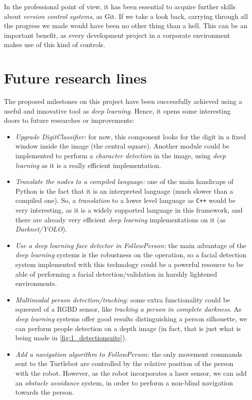	
	In the professional point of view, it has been essential to acquire further skills about \emph{version control systems}, as Git. If we take a look back, carrying through all the progress we made would have been no other thing than a hell. This can be an important benefit, as every development project in a corporate environment makes use of this kind of controls.

\section{Future research lines}
	The proposed milestones on this project have been successfully achieved using a useful and innovative tool as \emph{deep learning}. Hence, it opens some interesting doors to future researches or improvements:
	
	\begin{itemize}
		\item \emph{Upgrade DigitClassifier:} for now, this component looks for the digit in a fixed window inside the image (the central square). Another module could be implemented to perform a \emph{character detection} in the image, using \emph{deep learning} as it is a really efficient implementation.
		
		\item \emph{Translate the nodes to a compiled language:} one of the main handicaps of Python is the fact that it is an interpreted language (much slower than a compiled one). So, a \emph{translation} to a lower level language as \texttt{C++} would be very interesting, as it is a widely supported language in this framework, and there are already very efficient \emph{deep learning} implementations on it (as \emph{Darknet/YOLO}).
		
		\item \emph{Use a deep learning face detector in FollowPerson:} the main advantage of the \emph{deep learning} systems is the robustness on the operation, so a facial detection system implemented with this technology could be a powerful resource to be able of performing a facial detection/validation in harshly lightened environments.
		
		\item \emph{Multimodal person detection/tracking:} some extra functionality could be squeezed of a RGBD sensor, like \emph{tracking a person in complete darkness}. As \emph{deep learning} systems offer good results distinguishing a person silhouette, we can perform people detection on a depth image (in fact, that is just what is being made in \autoref{fig:1_detectionsuite}).
		
		
		\item \emph{Add a navigation algorithm to FollowPerson:} the only movement commands sent to the Turtlebot are controlled by the relative position of the person with the robot. However, as the robot incorporates a laser sensor, we can add an \emph{obstacle avoidance} system, in order to perform a non-blind navigation towards the person.
	\end{itemize}
